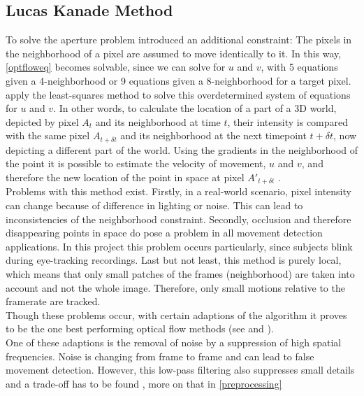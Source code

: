 \documentclass[Bachelorarbeit.tex]{subfiles}
\begin{document}
\subsection{Lucas Kanade Method}
\label{lk}
To solve the aperture problem \cite{lucas1981iterative} introduced an additional constraint: The pixels in the neighborhood of a pixel are assumed to move identically to it. In this way, \autoref{optfloweq} becomes solvable, since we can solve for $u$ and $v$, with 5 equations given a 4-neighborhood or 9 equations given a 8-neighborhood for a target pixel. \cite{lucas1981iterative} apply the least-squares method to solve this overdetermined system of equations for $u$ and $v$. 
In other words, to calculate the location of a part of a 3D world, depicted by pixel $A_t$ and its neighborhood at time $t$, their intensity is compared with the same pixel $A_{t+\delta t}$ and its neighborhood at the next timepoint $t+\delta t$, now depicting a different part of the world. Using the gradients in the neighborhood of the point it is possible to estimate the velocity of movement, $u$ and $v$, and therefore the new location of the point in space at pixel $A'_{t+\delta t}$ \citep{rojas2010lucas}. \\
Problems with this method exist. Firstly, in a real-world scenario, pixel intensity can change because of difference in lighting or noise. This can lead to inconsistencies of the neighborhood constraint. Secondly, occlusion and therefore disappearing points in space do pose a problem in all movement detection applications. In this project this problem occurs particularly, since subjects blink during eye-tracking recordings.  Last but not least, this method is purely local, which means that only small patches of the frames (neighborhood) are taken into account and not the whole image. Therefore, only small motions relative to the framerate are tracked. \\
Though these problems occur, with certain adaptions of the algorithm it proves to be the one best performing optical flow methods (see \cite{galvin1998recovering} and \cite{barron1992performance}).
\\One of these adaptions is the removal of noise by a suppression of high spatial frequencies. Noise is changing from frame to frame and can lead to false movement detection.
However, this low-pass filtering also suppresses small details and a trade-off has to be found \citep[p. 123]{lucas1981iterative}, more on that in \autoref{preprocessing}
\end{document}
